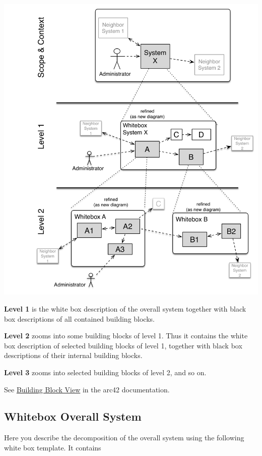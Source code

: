 \includegraphics{images/05_building_blocks-EN.png}

\textbf{Level 1} is the white box description of the overall system
together with black box descriptions of all contained building blocks.

\textbf{Level 2} zooms into some building blocks of level 1. Thus it
contains the white box description of selected building blocks of level
1, together with black box descriptions of their internal building
blocks.

\textbf{Level 3} zooms into selected building blocks of level 2, and so
on.

See \href{https://docs.arc42.org/section-5/}{Building Block View} in the
arc42 documentation.

\hypertarget{_whitebox_overall_system}{%
\subsection{Whitebox Overall System}\label{_whitebox_overall_system}}

Here you describe the decomposition of the overall system using the
following white box template. It contains

